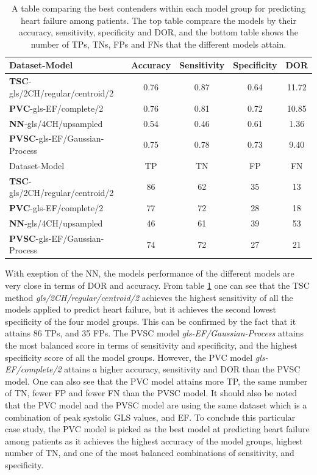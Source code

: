 \begin{table}
    \centering
    \begin{tabular}{lcccc}
        \toprule
        Dataset-Model                           &  Accuracy &  Sensitivity &  Specificity &  DOR \\
        \midrule
        \textbf{TSC}-gls/2CH/regular/centroid/2 &      0.76 &         0.87 &         0.64 & 11.72 \\
        \textbf{PVC}-gls-EF/complete/2          &      0.76 &         0.81 &         0.72 & 10.85 \\
        \textbf{NN}-gls/4CH/upsampled           &      0.54 &         0.46 &         0.61 & 1.36 \\
        \textbf{PVSC}-gls-EF/Gaussian-Process   &      0.75 &         0.78 &         0.73 & 9.40 \\
        \midrule
        Dataset-Model                           &  TP &  TN &  FP &  FN \\
        \midrule
        \textbf{TSC}-gls/2CH/regular/centroid/2 &  86 &  62 &  35 &  13 \\
        \textbf{PVC}-gls-EF/complete/2          &  77 &  72 &  28 &  18 \\
        \textbf{NN}-gls/4CH/upsampled           &  46 &  61 &  39 &  53 \\
        \textbf{PVSC}-gls-EF/Gaussian-Process   &  74 &  72 &  27 &  21 \\
        \bottomrule
    \end{tabular}
    \caption{A table comparing the best contenders within each model group for predicting heart failure among patients. 
             The top table comprare the models by their accuracy, sensitivity, specificity and DOR, 
             and the bottom table shows the number of TPs, TNs, FPs and FNs that the different models attain.}
    \label{tab:hf_compare}
\end{table}

With exeption of the NN, the models performance of the different models are very close in terms of DOR and accuracy.
From table \ref{tab:hf_compare} one can see that the TSC method \textit{gls/2CH/regular/centroid/2} achieves the highest sensitivity of all the models applied to predict heart failure,
but it achieves the second lowest specificity of the four model groups. This can be confirmed by the fact that it attains 86 TPs, and 35 FPs.
The PVSC model \textit{gls-EF/Gaussian-Process} attains the most balanced score in terms of sensitivity and specificity, and the highest specificity score of all the model groups.
However, the PVC model \textit{gls-EF/complete/2} attains a higher accuracy, sensitivity and DOR than the PVSC model. 
One can also see that the PVC model attains more TP, the same number of TN, fewer FP and fewer FN than the PVSC model.
It should also be noted that the PVC model and the PVSC model are using the same dataset which is a combination of peak systolic GLS values, and EF.
To conclude this particular case study, the PVC model is picked as the best model at predicting heart failure among patients as it achieves the highest accuracy of the model groups, highest
number of TN, and one of the most balanced combinations of sensitivity, and specificity.

